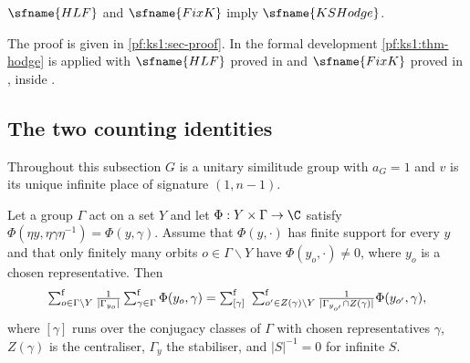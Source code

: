 \begin{theorem}\label{pf:ks1:thm-hodge}
$\sfname{HLF}$ and $\sfname{FixK}$ imply $\sfname{KSHodge}$.
\end{theorem}

The proof is given in \cref{pf:ks1:sec-proof}. In the formal development \cref{pf:ks1:thm-hodge} is applied with
$\sfname{HLF}$ proved in  and $\sfname{FixK}$ proved in
, inside .


\subsection{The two counting identities}\label{pf:ks1:sec-counting}

Throughout this subsection $G$ is a unitary similitude group with $a_G=1$ and $v$ is its unique infinite place of
signature $(1,n-1)$.

\begin{lemma}\label{pf:ks1:lem-unfold}
Let a group $\Gamma$ act on a set $Y$ and let $\Phi:Y\times\Gamma\to\C$ satisfy $\Phi(\eta y,\eta\gamma\eta^{-1})=\Phi(y,\gamma)$.
Assume that $\Phi(y,\cdot)$ has finite support for every $y$ and that only finitely many orbits $o\in\Gamma\backslash Y$ have
$\Phi(y_o,\cdot)\neq0$, where $y_o$ is a chosen representative. Then
\[\textstyle\sum\nolimits^{\mathrm f}_{o\in\Gamma\backslash Y}\frac{1}{|\Gamma_{y_o}|}\textstyle\sum\nolimits^{\mathrm f}_{\gamma\in\Gamma}\Phi(y_o,\gamma)=
\textstyle\sum\nolimits^{\mathrm f}_{[\gamma]}\ \textstyle\sum\nolimits^{\mathrm f}_{o'\in Z(\gamma)\backslash Y}\frac{1}{|\Gamma_{y_{o'}}\cap Z(\gamma)|}\Phi(y_{o'},\gamma),\]
where $[\gamma]$ runs over the conjugacy classes of $\Gamma$ with chosen representatives $\gamma$, $Z(\gamma)$ is the centraliser,
$\Gamma_y$ the stabiliser, and $|S|^{-1}=0$ for infinite $S$.
\end{lemma}

